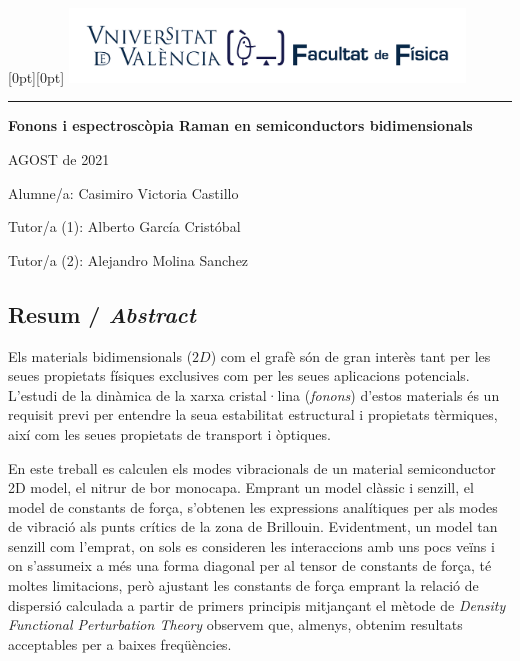 \documentclass[12pt]{article} %
\author{Casimiro Victoria Castillo}
\begin{document}
\begin{titlepage}
   \noindent\raisebox{0pt}[0pt][0pt]{
	\includegraphics[width=10.5cm]{./portada-TFG-LaTeX/marca-Facultat-Fisica-UV-1-linia.pdf}}\par
   \vspace{8.5cm}
   {\centering
      \par
      \rule{16.13cm}{1.5pt}\par
      \vspace{4.5cm}
      {\bfseries\sffamily\LARGE Fonons i espectroscòpia Raman en semiconductors bidimensionals}\par
   }
   \vfill
   {\raggedleft\sffamily
		AGOST de 2021\par
      \vspace{\baselineskip}
		Alumne/a: Casimiro Victoria Castillo\par
      \vspace{\baselineskip}
		Tutor/a (1): Alberto García Cristóbal\par
		Tutor/a (2): Alejandro Molina Sanchez\par
   }
\end{titlepage}
\restoregeometry


\subsection*{Resum / \emph{Abstract}}
 
 Els materials bidimensionals ($2D$) com el grafè són de gran interès tant per les seues propietats físiques exclusives com per les seues aplicacions potencials. L'estudi de la dinàmica de la xarxa cristal·lina (\textit{fonons}) d'estos materials és un requisit previ per entendre la seua estabilitat estructural i propietats tèrmiques, així com les seues propietats de transport i òptiques. 
 
 En este treball es calculen els modes vibracionals de un material semiconductor 2D model, el nitrur de bor monocapa. Emprant un model clàssic i senzill, el model de constants de força, s'obtenen les expressions analítiques per als modes de vibració als punts crítics de la zona de Brillouin. Evidentment, un model tan senzill com l'emprat, on sols es consideren les interaccions amb uns pocs veïns i on s'assumeix a més una forma diagonal per al tensor de constants de força, té moltes limitacions, però ajustant les constants de força emprant la relació de dispersió calculada a partir de primers principis mitjançant el mètode de \emph{Density Functional Perturbation Theory} observem que, almenys, obtenim resultats acceptables per a baixes freqüències.
\end{document}
